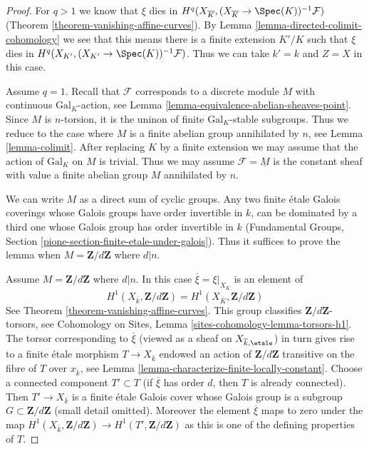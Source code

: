 \begin{proof}
For $q > 1$ we know that $\xi$ dies in
$H^q(X_{\overline{K}}, (X_{\overline{K}} \to \Spec(K))^{-1}\mathcal{F})$
(Theorem \ref{theorem-vanishing-affine-curves}).
By Lemma \ref{lemma-directed-colimit-cohomology} we see that
this means there is a finite extension $K'/K$ such that
$\xi$ dies in $H^q(X_{K'}, (X_{K'} \to \Spec(K))^{-1}\mathcal{F})$.
Thus we can take $k' = k$ and $Z = X$ in this case.

\medskip\noindent
Assume $q = 1$. Recall that $\mathcal{F}$ corresponds to a
discrete module $M$ with continuous $\text{Gal}_K$-action, see
Lemma \ref{lemma-equivalence-abelian-sheaves-point}.
Since $M$ is $n$-torsion, it is the uninon of finite
$\text{Gal}_K$-stable subgroups. Thus
we reduce to the case where $M$ is a finite abelian group annihilated by $n$,
see Lemma \ref{lemma-colimit}. After replacing $K$ by a finite extension
we may assume that the action of $\text{Gal}_K$ on $M$ is trivial.
Thus we may assume $\mathcal{F} = \underline{M}$ is the constant
sheaf with value a finite abelian group $M$ annihilated by $n$.

\medskip\noindent
We can write $M$ as a direct sum of cyclic groups.
Any two finite \'etale Galois coverings whose Galois groups
have order invertible in $k$, can be dominated by a third one whose
Galois group has order invertible in $k$
(Fundamental Groups, Section \ref{pione-section-finite-etale-under-galois}).
Thus it suffices to prove the lemma when
$M = \mathbf{Z}/d\mathbf{Z}$ where $d | n$.

\medskip\noindent
Assume $M = \mathbf{Z}/d\mathbf{Z}$ where $d | n$.
In this case $\overline{\xi} = \xi|_{X_{\overline{K}}}$ is an element of
$$
H^1(X_{\overline{k}}, \mathbf{Z}/d\mathbf{Z}) =
H^1(X_{\overline{K}}, \mathbf{Z}/d\mathbf{Z})
$$
See Theorem \ref{theorem-vanishing-affine-curves}.
This group classifies $\mathbf{Z}/d\mathbf{Z}$-torsors, see
Cohomology on Sites, Lemma \ref{sites-cohomology-lemma-torsors-h1}.
The torsor corresponding to $\overline{\xi}$ (viewed as a sheaf on
$X_{\overline{k}, \etale}$) in turn gives rise to a finite \'etale morphism
$T \to X_{\overline{k}}$ endowed an action of $\mathbf{Z}/d\mathbf{Z}$
transitive on the fibre of $T$ over $x_{\overline{k}}$, see
Lemma \ref{lemma-characterize-finite-locally-constant}.
Choose a connected component $T' \subset T$ (if $\overline{\xi}$ has
order $d$, then $T$ is already connected).
Then $T' \to X_{\overline{k}}$ is a finite \'etale Galois
cover whose Galois group is a subgroup $G \subset \mathbf{Z}/d\mathbf{Z}$
(small detail omitted). Moreover the element $\overline{\xi}$ maps to zero
under the map $H^1(X_{\overline{k}}, \mathbf{Z}/d\mathbf{Z}) \to
H^1(T', \mathbf{Z}/d\mathbf{Z})$ as this is one
of the defining properties of $T$.


\end{proof}
